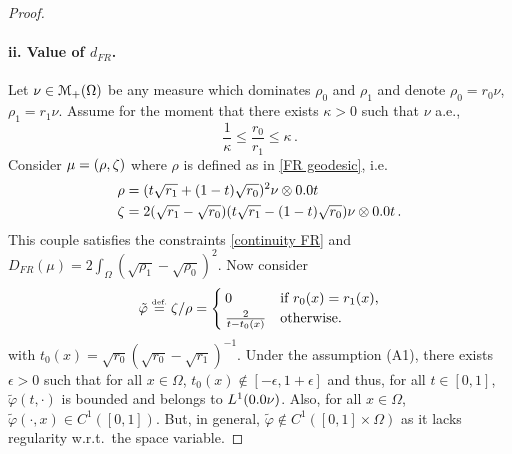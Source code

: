 \begin{proof}
\paragraph{ii. Value of $d_{FR}$.} Let $\nu \in \mathcal{M}_+(\Omega)$ be any measure which dominates $\rho_0$ and $\rho_1$ and denote $\rho_0 = r_0 \nu$, $\rho_1 = r_1 \nu$. Assume for the moment that there exists $\kappa>0$ such that $\nu$ a.e.,
\[
\frac{1}{\kappa} \leq \frac{r_0}{r_1} \leq \kappa\, . \tag{A1}
\]
%
 Consider $\mu=(\rho,\zeta)$ where $\rho$ is defined as in \eqref{FR geodesic}, i.e.
 \begin{align*}
 \rho &= (t\sqrt{r_1} +(1-t)\sqrt{r_0})^2 \nu \otimes \d t\\
 \Z    &= 2(\sqrt{r_1}-\sqrt{r_0})(t\sqrt{r_1}-(1-t) \sqrt{r_0}) \nu \otimes \d t\, .
 \end{align*}
 This couple satisfies the constraints \eqref{continuity FR} and $D_{FR}(\mu)=2\int_{\Omega}(\sqrt{\rho_1}-\sqrt{\rho_0})^2$. 
%
Now consider 
\[
\tilde{\varphi} \stackrel{\mbox{\upshape\tiny def.}}{=} \zeta/\rho= 
\begin{cases}
0 & \text{if $r_0(x) = r_1(x)$,} \\
\frac{2}{t-t_0(x)} & \text{otherwise.}
\end{cases}
\] with $t_0(x)=\sqrt{r_0}\left( \sqrt{r_0}-\sqrt{r_1} \right)^{-1}$. Under the assumption (A1), there exists $\epsilon>0$ such that for all $x\in \Omega$, $t_0(x) \notin [-\epsilon,1+\epsilon]$ and thus, for all $t\in[0,1]$, $\tilde{\varphi}(t,\cdot)$ is bounded and belongs to $L^1(\d \nu)$. Also, for all $x\in \Omega$, $\tilde{\varphi}(\cdot,x)\in C^1([0,1])$. But, in general, $\tilde{\varphi} \notin C^1( [0,1] \times \Omega)$ as it lacks regularity w.r.t.\ the space variable.
%


\end{proof}
